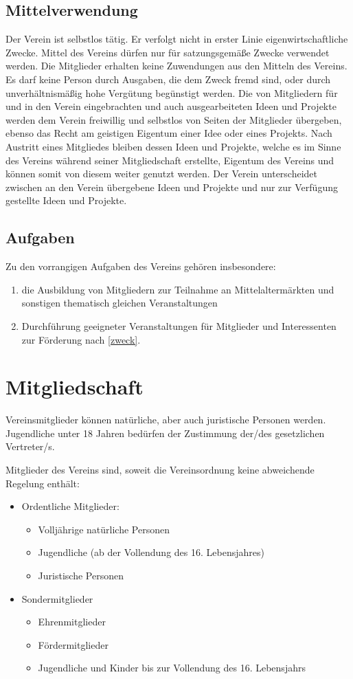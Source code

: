 \documentclass[10pt,a4paper]{article}
\begin{document}
\subsection{Mittelverwendung}
Der Verein ist selbstlos tätig.
Er verfolgt nicht in erster Linie eigenwirtschaftliche Zwecke.
Mittel des Vereins dürfen nur für satzungsgemäße Zwecke verwendet werden.
Die Mitglieder erhalten keine Zuwendungen aus den Mitteln des Vereins.
Es darf keine Person durch Ausgaben, die dem Zweck fremd sind,
oder durch unverhältnismäßig hohe Vergütung begünstigt werden.
Die von Mitgliedern für und in den Verein eingebrachten und auch ausgearbeiteten Ideen und Projekte werden dem Verein freiwillig und selbstlos von Seiten der Mitglieder übergeben,
ebenso das Recht am geistigen Eigentum einer Idee oder eines Projekts.
Nach Austritt eines Mitgliedes bleiben dessen Ideen und Projekte,
welche es im Sinne des Vereins während seiner Mitgliedschaft erstellte,
Eigentum des Vereins und können somit von diesem weiter genutzt werden.
Der Verein unterscheidet zwischen an den Verein übergebene Ideen und Projekte und nur zur Verfügung gestellte Ideen und Projekte.
\subsection{Aufgaben}

Zu den vorrangigen Aufgaben des Vereins gehören insbesondere:
\begin{enumerate}
\item
die Ausbildung von Mitgliedern zur Teilnahme an Mittelaltermärkten und sonstigen thematisch gleichen Veranstaltungen
\item
Durchführung geeigneter Veranstaltungen für Mitglieder und Interessenten zur Förderung nach \ref{zweck}.
\end{enumerate}

\section{Mitgliedschaft}
Vereinsmitglieder können natürliche, aber auch juristische Personen werden. Jugendliche unter 18 Jahren
bedürfen der Zustimmung der/des gesetzlichen Vertreter/s.


Mitglieder des Vereins sind, soweit die Vereinsordnung keine abweichende Regelung enthält:
\begin{itemize}
\item
Ordentliche Mitglieder:
\begin{itemize}
\item Volljährige natürliche Personen
\item Jugendliche (ab der Vollendung des 16. Lebensjahres)
\item Juristische Personen
\end{itemize}
\item 
Sondermitglieder
\begin{itemize}
\item
Ehrenmitglieder
\item
Fördermitglieder
\item
Jugendliche und Kinder bis zur Vollendung des 16. Lebensjahrs
\end{itemize}
\end{itemize}
\end{document}
